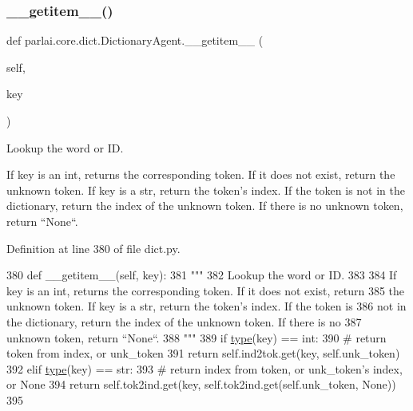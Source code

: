 \subsubsection{\texorpdfstring{\+\_\+\+\_\+getitem\+\_\+\+\_\+()}{\_\_getitem\_\_()}}
{\footnotesize\ttfamily def parlai.\+core.\+dict.\+Dictionary\+Agent.\+\_\+\+\_\+getitem\+\_\+\+\_\+ (\begin{DoxyParamCaption}\item[{}]{self,  }\item[{}]{key }\end{DoxyParamCaption})}

\begin{DoxyVerb}Lookup the word or ID.

If key is an int, returns the corresponding token. If it does not exist, return
the unknown token. If key is a str, return the token's index. If the token is
not in the dictionary, return the index of the unknown token. If there is no
unknown token, return ``None``.
\end{DoxyVerb}
 

Definition at line 380 of file dict.\+py.


\begin{DoxyCode}
380     \textcolor{keyword}{def }\_\_getitem\_\_(self, key):
381         \textcolor{stringliteral}{"""}
382 \textcolor{stringliteral}{        Lookup the word or ID.}
383 \textcolor{stringliteral}{}
384 \textcolor{stringliteral}{        If key is an int, returns the corresponding token. If it does not exist, return}
385 \textcolor{stringliteral}{        the unknown token. If key is a str, return the token's index. If the token is}
386 \textcolor{stringliteral}{        not in the dictionary, return the index of the unknown token. If there is no}
387 \textcolor{stringliteral}{        unknown token, return ``None``.}
388 \textcolor{stringliteral}{        """}
389         \textcolor{keywordflow}{if} \hyperlink{namespaceparlai_1_1agents_1_1tfidf__retriever_1_1build__tfidf_ad5dfae268e23f506da084a9efb72f619}{type}(key) == int:
390             \textcolor{comment}{# return token from index, or unk\_token}
391             \textcolor{keywordflow}{return} self.ind2tok.get(key, self.unk\_token)
392         \textcolor{keywordflow}{elif} \hyperlink{namespaceparlai_1_1agents_1_1tfidf__retriever_1_1build__tfidf_ad5dfae268e23f506da084a9efb72f619}{type}(key) == str:
393             \textcolor{comment}{# return index from token, or unk\_token's index, or None}
394             \textcolor{keywordflow}{return} self.tok2ind.get(key, self.tok2ind.get(self.unk\_token, \textcolor{keywordtype}{None}))
395 
\end{DoxyCode}
\mbox{\label{classparlai_1_1core_1_1dict_1_1DictionaryAgent_a1c686bb8b03cf09dbd43943d268c2410}} 
